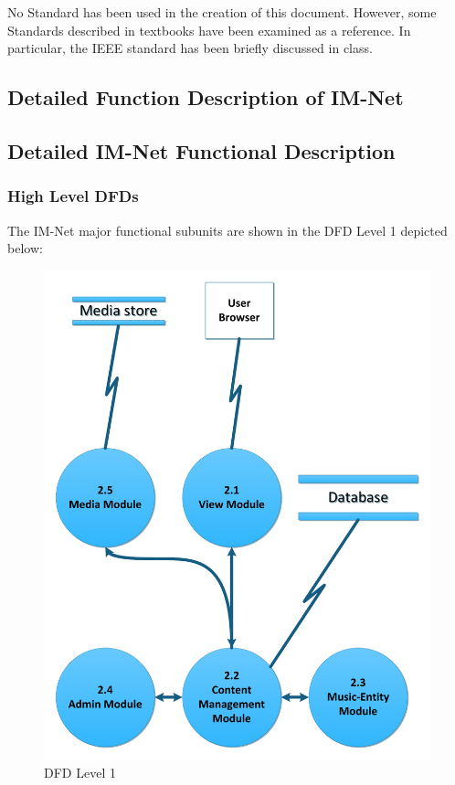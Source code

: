 \documentclass[letterpaper,12pt]{article}
\newcommand{\Section}[1]{\section{#1} \setcounter{figure}{0}}
\begin{document}
{No Standard has been used in the creation of this document. However, some Standards described in textbooks have been examined as a reference. In particular, the IEEE standard has been briefly discussed in class.

\eject

\textcolor{section}{\Section{Detailed Function Description of IM-Net}}

\textcolor{subsection}{\subsection{Detailed IM-Net Functional Description}}

\textcolor{subsubsection}{\subsubsection{High Level DFDs}}

The IM-Net major functional subunits are shown in the DFD Level 1 depicted below:

\begin{figure}[h!]
\centering
\includegraphics[scale=0.6]{DFD_level_1.pdf}
\caption{DFD Level 1}
\label{fig:DFD_level_1}
\end{figure}
 
}
\end{document}
